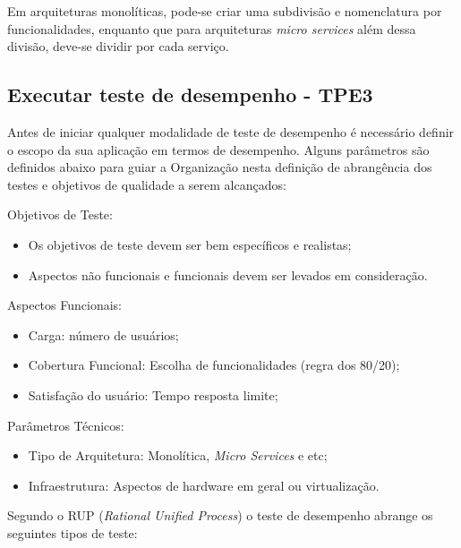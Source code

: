Em arquiteturas monolíticas, pode-se criar uma subdivisão e nomenclatura por funcionalidades, enquanto que para arquiteturas \textit{micro services} além dessa divisão, deve-se dividir por cada  serviço.


\subsection{Executar teste de desempenho - TPE3}

Antes de iniciar qualquer modalidade de teste de desempenho é necessário definir o escopo da sua aplicação em termos de desempenho. Alguns parâmetros são definidos abaixo para guiar a Organização nesta definição de abrangência dos testes e objetivos de qualidade a serem alcançados: 

Objetivos de Teste:

\begin{itemize}
	\item Os objetivos de teste devem ser bem específicos e realistas;
	\item Aspectos não funcionais e funcionais devem ser levados em consideração.
\end{itemize}

Aspectos Funcionais:

\begin{itemize}
	\item Carga: número de usuários;
	\item Cobertura Funcional: Escolha de funcionalidades (regra dos 80/20);
	\item Satisfação do usuário: Tempo resposta limite;
\end{itemize}

Parâmetros Técnicos:

\begin{itemize}
	\item Tipo de Arquitetura: Monolítica, \textit{Micro Services} e etc;
	\item Infraestrutura: Aspectos de hardware em geral ou virtualização.
\end{itemize}


Segundo o RUP (\textit{Rational Unified Process}) \cite{RUP940320} o teste de desempenho abrange os seguintes tipos de teste:

